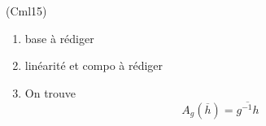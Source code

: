 \begin{tiny}(Cml15)\end{tiny} 
\begin{enumerate}
  \item base à rédiger
  \item linéarité et compo à rédiger
  \item On trouve
\begin{displaymath}
  A_g(\overline{h}) = \overline{g^{-1}h}
\end{displaymath}

\end{enumerate}
